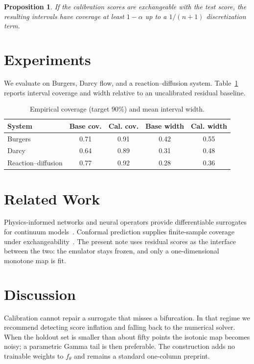 \documentclass[11pt,a4paper]{article}
\newtheorem{proposition}[theorem]{Proposition}
\begin{document}
\begin{proposition}
If the calibration scores are exchangeable with the test score, the resulting intervals have coverage at least $1-\alpha$ up to a $1/(n+1)$ discretization term.
\end{proposition}

\section{Experiments}

We evaluate on Burgers, Darcy flow, and a reaction--diffusion system. Table~\ref{tab:coverage} reports interval coverage and width relative to an uncalibrated residual baseline.

\begin{table}[t]
\centering
\caption{Empirical coverage (target $90\%$) and mean interval width.}
\label{tab:coverage}
\begin{tabular}{@{}lcccc@{}}
\toprule
\textbf{System} & \textbf{Base cov.} & \textbf{Cal. cov.} & \textbf{Base width} & \textbf{Cal. width} \\
\midrule
Burgers & 0.71 & 0.91 & 0.42 & 0.55 \\
Darcy & 0.64 & 0.89 & 0.31 & 0.48 \\
Reaction--diffusion & 0.77 & 0.92 & 0.28 & 0.36 \\
\bottomrule
\end{tabular}
\end{table}

\section{Related Work}

Physics-informed networks and neural operators provide differentiable surrogates for continuum models~\cite{raissi2019physics,karniadakis2021physics,li2021fno}. Conformal prediction supplies finite-sample coverage under exchangeability~\cite{vovk2005}. The present note uses residual scores as the interface between the two: the emulator stays frozen, and only a one-dimensional monotone map is fit.

\section{Discussion}

Calibration cannot repair a surrogate that misses a bifurcation. In that regime we recommend detecting score inflation and falling back to the numerical solver. When the holdout set is smaller than about fifty points the isotonic map becomes noisy; a parametric Gamma tail is then preferable. The construction adds no trainable weights to $f_\theta$ and remains a standard one-column preprint.
\end{document}
